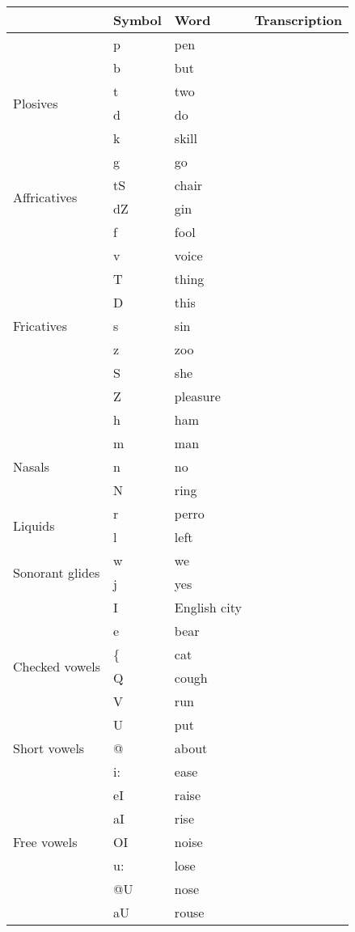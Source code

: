 {\small
\begin{longtable}{l|l|p{.3\linewidth}|l}
	& Symbol & Word & Transcription\\
	\hline
	\multirow{6}{*}{Plosives} &
	  p & pen &\\
	& b & but &\\
	& t & two &\\
	& d & do &\\
	& k & skill &\\
	& g & go &\\
	\hline
	\multirow{2}{*}{Affricatives} &
	tS & chair &\\
	& dZ & gin &\\
	\hline
	\multirow{9}{*}{Fricatives} &
		f & fool &\\
	& v & voice &\\
	& T & thing &\\
	& D & this &\\
	& s & sin &\\
	& z & zoo &\\
	& S & she &\\
	& Z & pleasure &\\
	& h & ham &\\
	\hline
	\multirow{3}{*}{Nasals} &
	m & man &\\
	& n & no &\\
	& N & ring &\\
	\hline
	\multirow{2}{*}{Liquids} &
	r & perro &\\
	& l & left &\\
	\hline
	\multirow{2}{*}{Sonorant glides} &
	w & we &\\
	& j & yes &\\
	\hline
	\multirow{6}{*}{Checked vowels} &
	I & English city &\\
	& e & bear &\\
	& \{ & cat &\\
	& Q & cough &\\
	& V & run &\\
	& U & put &\\
	\hline
	\multirow{1}{*}{Short vowels} &
	@ & about &\\
	\hline
	\multirow{13}{*}{Free vowels} &
	i: & ease &\\
	& eI & raise &\\
	& aI & rise &\\
	& OI & noise &\\
	& u: & lose &\\
	& @U & nose &\\
	& aU & rouse &\\

\end{longtable}}
